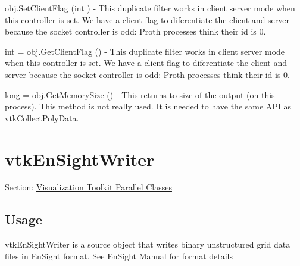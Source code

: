 \begin{DoxyItemize}
\item {\ttfamily obj.\-Set\-Client\-Flag (int )} -\/ This duplicate filter works in client server mode when this controller is set. We have a client flag to diferentiate the client and server because the socket controller is odd\-: Proth processes think their id is 0.  
\item {\ttfamily int = obj.\-Get\-Client\-Flag ()} -\/ This duplicate filter works in client server mode when this controller is set. We have a client flag to diferentiate the client and server because the socket controller is odd\-: Proth processes think their id is 0.  
\item {\ttfamily long = obj.\-Get\-Memory\-Size ()} -\/ This returns to size of the output (on this process). This method is not really used. It is needed to have the same A\-P\-I as vtk\-Collect\-Poly\-Data.  
\end{DoxyItemize}\hypertarget{vtkparallel_vtkensightwriter}{}\section{vtk\-En\-Sight\-Writer}\label{vtkparallel_vtkensightwriter}
Section\-: \hyperlink{sec_vtkparallel}{Visualization Toolkit Parallel Classes} \hypertarget{vtkwidgets_vtkxyplotwidget_Usage}{}\subsection{Usage}\label{vtkwidgets_vtkxyplotwidget_Usage}
vtk\-En\-Sight\-Writer is a source object that writes binary unstructured grid data files in En\-Sight format. See En\-Sight Manual for format details

